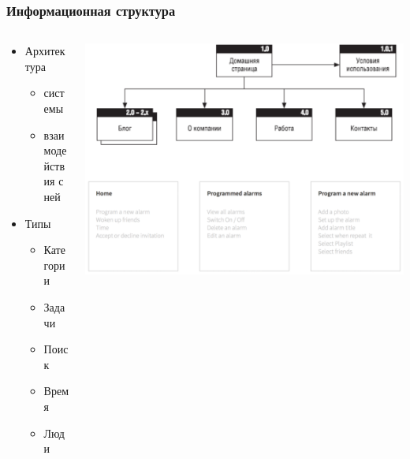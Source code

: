 \documentclass{../../slides-style}
\begin{document}
    \begin{frame}
        \frametitle{Информационная структура}
        \begin{columns}
            \begin{column}{0.4\textwidth}
                \begin{itemize}
                    \item Архитектура
                    \begin{itemize}
                        \item системы
                        \item взаимодействия с ней
                    \end{itemize}
                    \item Типы
                    \begin{itemize}
                        \item Категории
                        \item Задачи
                        \item Поиск
                        \item Время
                        \item Люди
                    \end{itemize}
                \end{itemize}
            \end{column}
            \begin{column}{0.6\textwidth}
                \begin{center}
                    \includegraphics[width=\textwidth]{informationStructure.png}
                \end{center}
            \end{column}
        \end{columns}
    \end{frame}
\end{document}
